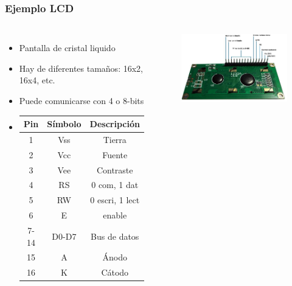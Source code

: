 \documentclass[10.5pt,scale=1.0,t,aspectratio=169,hyperref={pdfpagelabels=false}]{beamer}
\begin{document}
\begin{frame}
	\frametitle{Ejemplo LCD}
	\begin{columns}
		\begin{itemize}
			\item Pantalla de cristal liquido
			\item Hay de diferentes tamaños: 16x2, 16x4, etc.
			\item Puede comunicarse con 4 o 8-bits
			\item[] 
			\begin{small}
				\begin{center}
					\begin{tabular}{ c c c }
						\hline
						\textbf{Pin} & \textbf{Símbolo} & \textbf{Descripción} \\ 
						\hline
						1 & Vss & Tierra \\  
						2 & Vcc & Fuente  \\
						3 & Vee & Contraste \\
						4 & RS & 0 com, 1 dat \\
						5 & RW & 0 escri, 1 lect \\
						6 & E & enable \\
						7-14 & D0-D7 & Bus de datos \\
						15 & A & Ánodo \\
						16 & K & Cátodo \\
						\hline  
					\end{tabular}
				\end{center}
			\end{small}
		\end{itemize}
		\begin{figure}
			\centering
			\includegraphics[scale=0.37]{17_LCD}
		\end{figure}
	\end{columns}
\end{frame}
\end{document}
